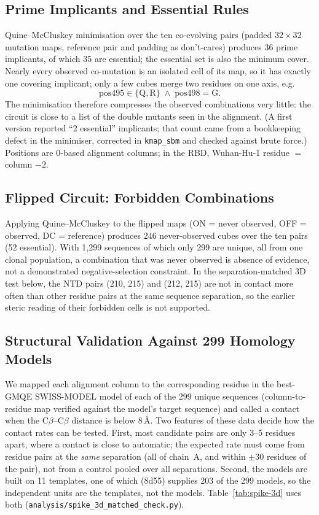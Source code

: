 \subsection{Prime Implicants and Essential Rules}
Quine--McCluskey minimisation over the ten co-evolving pairs (padded
$32\times32$ mutation maps, reference pair and padding as don't-cares)
produces 36 prime implicants, of which 35 are essential; the essential set is
also the minimum cover.  Nearly every observed co-mutation is an isolated
cell of its map, so it has exactly one covering implicant; only a few cubes
merge two residues on one axis, e.g.
\begin{equation}
	\text{pos}495 \in \{\text{Q},\text{R}\} \;\wedge\; \text{pos}498 = \text{G}.
\end{equation}
The minimisation therefore compresses the observed combinations very little:
the circuit is close to a list of the double mutants seen in the alignment.
(A first version reported ``2 essential'' implicants; that count came from a
bookkeeping defect in the minimiser, corrected in \texttt{kmap\_sbm} and
checked against brute force.)  Positions are 0-based alignment columns; in
the RBD, Wuhan-Hu-1 residue $=$ column $- 2$.

\subsection{Flipped Circuit: Forbidden Combinations}
Applying Quine--McCluskey to the flipped maps (ON = never observed, OFF =
observed, DC = reference) produces 246 never-observed cubes over the ten
pairs (52 essential).  With 1{,}299 sequences of which only 299 are unique,
all from one clonal population, a combination that was never observed is
absence of evidence, not a demonstrated negative-selection constraint.  In
the separation-matched 3D test below, the NTD pairs (210, 215) and (212, 215)
are not in contact more often than other residue pairs at the same sequence
separation, so the earlier steric reading of their forbidden cells is not
supported.

\subsection{Structural Validation Against 299 Homology Models}
We mapped each alignment column to the corresponding residue in the best-GMQE
SWISS-MODEL model of each of the 299 unique sequences (column-to-residue map
verified against the model's target sequence) and called a contact when the
C$\beta$--C$\beta$ distance is below 8\,\AA{}.  Two features of these data
decide how the contact rates can be tested.  First, most candidate pairs are
only 3--5 residues apart, where a contact is close to automatic; the expected
rate must come from residue pairs at the \emph{same} separation (all of
chain~A, and within $\pm30$ residues of the pair), not from a control pooled
over all separations.  Second, the models are built on 11 templates, one of
which (8d55) supplies 203 of the 299 models, so the independent units are the
templates, not the models.  Table~\ref{tab:spike-3d} uses both
(\texttt{analysis/spike\_3d\_matched\_check.py}).


